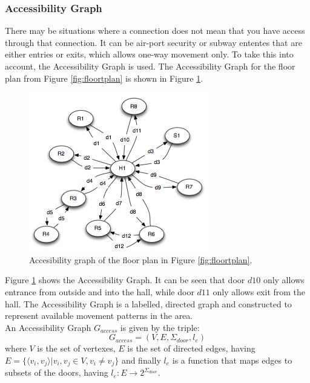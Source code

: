 \subsubsection{ \quad Accessibility Graph}
There may be situations where a connection does not mean that you have access through that connection.
It can be air-port security or subway ententes that are either entries or exits, which allows one-way movement only.
To take this into account, the Accessibility Graph is used. 
The Accessibility Graph for the floor plan from Figure \ref{fig:floortplan} is shown in Figure \ref{fig:accesibbilitygraph}.
\begin{figure}[]%
\centering
\includegraphics[width=0.8\columnwidth]{images/accessibilitygraph.png}%
\caption{Accesibility graph of the floor plan in Figure \ref{fig:floortplan}.} %
\label{fig:accesibbilitygraph}%
\end{figure}%
Figure \ref{fig:accesibbilitygraph} shows the Accessibility Graph.
It can be seen that door $d10$ only allows entrance from outside and into the hall, while door $d11$ only allows exit from the hall.
The Accessibility Graph is a labelled, directed graph and constructed to represent available movement patterns in the area. \\
An Accessibility Graph $G_{access}$ is given by the triple: 
\begin{equation}
G_{access} = (V, E, \Sigma_{door}, l_e)
\end{equation} 
where $V$ is the set of vertexes, $E$ is the set of directed edges, having $E = \{\langle v_i, v_j \rangle | v_i, v_j \in V,  v_i \not= v_j\}$ and finally $l_e$ is a function that maps edges to subsets of the doors, having $l_e : E \rightarrow 2^{\Sigma_{door}}$. \\

